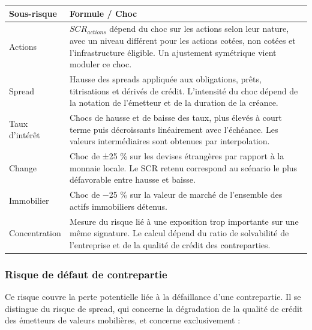 \documentclass[
]{article}
\begin{document}
\begin{longtable}[]{@{}
  >{\raggedright\arraybackslash}p{}
  >{\raggedright\arraybackslash}p{}@{}}
\toprule\noalign{}
\begin{minipage}[b]{\linewidth}\raggedright
Sous-risque
\end{minipage} & \begin{minipage}[b]{\linewidth}\raggedright
Formule / Choc
\end{minipage} \\
\midrule\noalign{}
\endhead
\bottomrule\noalign{}
\endlastfoot
Actions & \(SCR_{actions}\) dépend du choc sur les actions selon leur
nature, avec un niveau différent pour les actions cotées, non cotées et
l'infrastructure éligible. Un ajustement symétrique vient moduler ce
choc. \\
Spread & Hausse des spreads appliquée aux obligations, prêts,
titrisations et dérivés de crédit. L'intensité du choc dépend de la
notation de l'émetteur et de la duration de la créance. \\
Taux d'intérêt & Chocs de hausse et de baisse des taux, plus élevés à
court terme puis décroissants linéairement avec l'échéance. Les valeurs
intermédiaires sont obtenues par interpolation. \\
Change & Choc de ±25 \% sur les devises étrangères par rapport à la
monnaie locale. Le SCR retenu correspond au scénario le plus défavorable
entre hausse et baisse. \\
Immobilier & Choc de −25 \% sur la valeur de marché de l'ensemble des
actifs immobiliers détenus. \\
Concentration & Mesure du risque lié à une exposition trop importante
sur une même signature. Le calcul dépend du ratio de solvabilité de
l'entreprise et de la qualité de crédit des contreparties. \\
\end{longtable}

\subsubsection{Risque de défaut de
contrepartie}\label{risque-de-duxe9faut-de-contrepartie}

Ce risque couvre la perte potentielle liée à la défaillance d'une
contrepartie. Il se distingue du risque de spread, qui concerne la
dégradation de la qualité de crédit des émetteurs de valeurs mobilières,
et concerne exclusivement :
\end{document}
